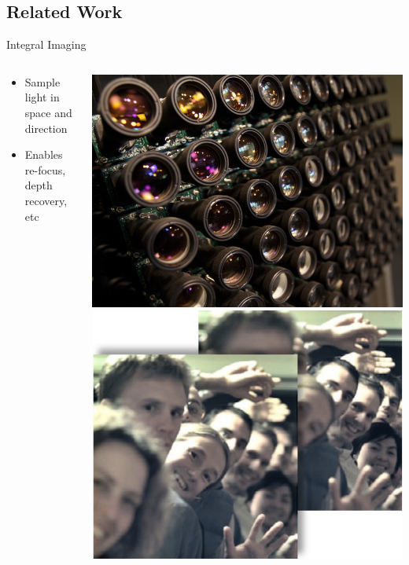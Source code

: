 \documentclass[compress,red,12pt]{beamer}
\begin{document}

\subsection{Related Work}

\begin{frame}{Integral Imaging}
  \begin{columns}[T]
    \begin{column}{.7\textwidth}
      \begin{itemize}
      \item Sample light in space and direction
      \item Enables re-focus, depth recovery, etc
      \end{itemize}
    \end{column}
    \begin{column}{.3\textwidth}
      \centering
      \includegraphics[height=0.30\textheight]{stanford_camera_array_640x480.jpg}
      \includegraphics[height=0.30\textheight]{lytro.jpg}
    \end{column}
  \end{columns}
\end{frame}
\end{document}
